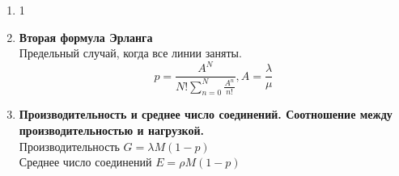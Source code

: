 \documentclass[12pt]{article}
\begin{document}
\begin{enumerate}
	\item 1
	\item \textbf{Вторая формула Эрланга} \\
	Предельный случай, когда все линии заняты.
	\[
	 	p = \frac{A ^ N}
	 	{N!\sum_{n=0}^{N} \frac{A ^ n}{n!}}, A = \frac{\lambda}{\mu}
	\]

	\item \textbf{Производительность и среднее число соединений.
	Соотношение между производительностью и нагрузкой.} \\
		Производительность $G = \lambda M(1-p)$ \\
		Среднее число соединений $E = \rho M(1-p)$

\end{enumerate}
\end{document}

